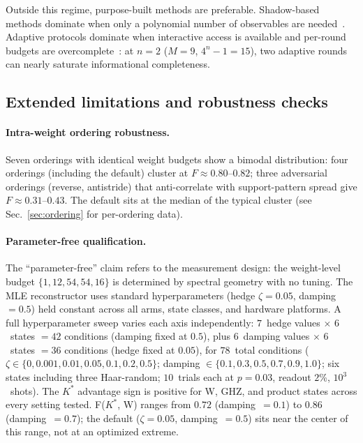 \documentclass[twocolumn,prx,aps,superscriptaddress,longbibliography]{revtex4-2}
\begin{document}
Outside this regime, purpose-built methods are preferable.
Shadow-based methods dominate when only a polynomial number of
observables are needed~\cite{Huang2020}.
Adaptive protocols dominate when interactive access is available
and per-round budgets are overcomplete~\cite{Huszar2012}: at $n = 2$
($M = 9$, $4^n - 1 = 15$), two adaptive rounds can nearly saturate
informational completeness.

\subsection{Extended limitations and robustness checks}
\label{sec:extended-limitations}

\paragraph{Intra-weight ordering robustness.}
Seven orderings with identical weight budgets show a
bimodal distribution: four orderings (including the default) cluster
at $F \approx 0.80$--$0.82$; three adversarial orderings (reverse,
antistride) that anti-correlate with support-pattern spread give
$F \approx 0.31$--$0.43$.  The default sits at the median of the
typical cluster (see Sec.~\ref{sec:ordering} for per-ordering data).

\paragraph{Parameter-free qualification.}
\label{sec:param-free}
The ``parameter-free'' claim refers to the measurement design:
the weight-level budget $\{1, 12, 54, 54, 16\}$ is determined by
spectral geometry with no tuning.  The MLE reconstructor uses
standard hyperparameters (hedge $\zeta = 0.05$, damping $= 0.5$)
held constant across all arms, state classes,
and hardware platforms.
A full hyperparameter sweep varies each axis independently:
$7$~hedge values $\times$ $6$~states $= 42$ conditions
(damping fixed at $0.5$), plus $6$~damping values $\times$
$6$~states $= 36$ conditions (hedge fixed at $0.05$), for
$78$~total conditions
($\zeta \in \{0, 0.001, 0.01, 0.05, 0.1, 0.2, 0.5\}$;
damping $\in \{0.1, 0.3, 0.5, 0.7, 0.9, 1.0\}$;
six states including three Haar-random; $10$~trials
each at $p = 0.03$, readout $2$\%, $10^3$~shots).
The $K^*$ advantage sign is positive for W, GHZ, and product
states across every setting tested.
F($K^*$, W) ranges from $0.72$ (damping~$= 0.1$) to $0.86$
(damping~$= 0.7$); the default ($\zeta = 0.05$, damping~$= 0.5$)
sits near the center of this range, not at an optimized extreme.
\end{document}
